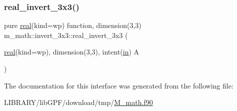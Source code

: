 \subsubsection{\texorpdfstring{real\+\_\+invert\+\_\+3x3()}{real\_invert\_3x3()}}
{\footnotesize\ttfamily pure \hyperlink{read__watch_83_8txt_abdb62bde002f38ef75f810d3a905a823}{real}(kind=wp) function, dimension(3,3) m\+\_\+math\+::invert\+\_\+3x3\+::real\+\_\+invert\+\_\+3x3 (\begin{DoxyParamCaption}\item[{\hyperlink{read__watch_83_8txt_abdb62bde002f38ef75f810d3a905a823}{real}(kind=wp), dimension(3,3), intent(\hyperlink{M__journal_83_8txt_afce72651d1eed785a2132bee863b2f38}{in})}]{A }\end{DoxyParamCaption})\hspace{0.3cm}{\ttfamily [private]}}



The documentation for this interface was generated from the following file\+:\begin{DoxyCompactItemize}
\item 
L\+I\+B\+R\+A\+R\+Y/lib\+G\+P\+F/download/tmp/\hyperlink{M__math_8f90}{M\+\_\+math.\+f90}\end{DoxyCompactItemize}
